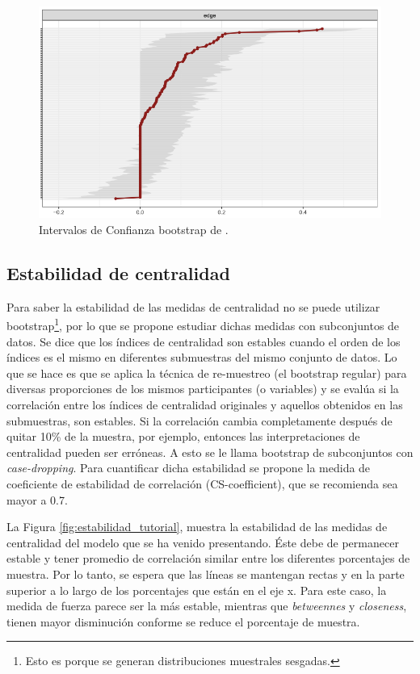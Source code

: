 \documentclass[11pt,spanish]{article}\usepackage[]{graphicx}\usepackage[]{color}
\begin{document}
\begin{figure}[!ht]
\centering
\includegraphics[scale=0.5]{images/intervalos_boot_tutorial}
\caption{Intervalos de Confianza bootstrap de \cite{main_tutorial}.}
\label{fig:inter_boot_tutorial}
\end{figure}

\subsection{Estabilidad de centralidad}

Para saber la estabilidad de las medidas de centralidad no se puede utilizar bootstrap\footnote{Esto es porque se generan distribuciones muestrales sesgadas.}, por lo que se propone estudiar dichas medidas con subconjuntos de datos. Se dice que los índices de centralidad son estables cuando el orden de los índices es el mismo en diferentes submuestras del mismo conjunto de datos. Lo que se hace es que se aplica la técnica de re-muestreo (el bootstrap regular) para diversas proporciones de los mismos participantes (o variables) y se evalúa si la correlación entre los índices de centralidad originales y aquellos obtenidos en las submuestras, son estables. Si la correlación cambia completamente después de quitar 10\% de la muestra, por ejemplo, entonces las interpretaciones de centralidad pueden ser erróneas. A esto se le llama bootstrap de subconjuntos con \emph{case-dropping}. Para cuantificar dicha estabilidad se propone la medida de coeficiente de estabilidad de correlación (CS-coefficient), que se recomienda sea mayor a 0.7.


La Figura \ref{fig:estabilidad_tutorial}, muestra la estabilidad de las medidas de centralidad del modelo que se ha venido presentando. Éste debe de permanecer estable y tener promedio de correlación similar entre los diferentes porcentajes de muestra. Por lo tanto, se espera que las líneas se mantengan rectas y en la parte superior a lo largo de los porcentajes que están en el eje x. Para este caso, la medida de fuerza parece ser la más estable, mientras que \emph{betweennes} y \emph{closeness}, tienen mayor disminución conforme se reduce el porcentaje de muestra. 
\end{document}
